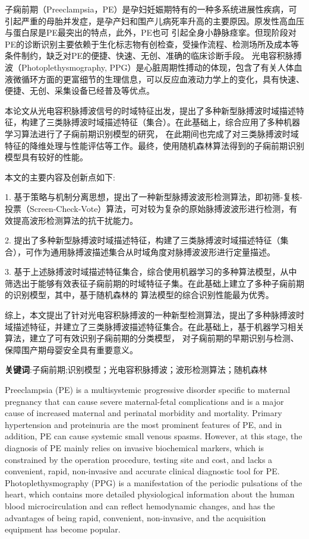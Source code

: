 \cleardoublepage
{}
子痫前期（Preeclampsia，PE）是孕妇妊娠期特有的一种多系统进展性疾病，可引起严重的母胎并发症，是孕产妇和围产儿病死率升高的主要原因。原发性高血压与蛋白尿是PE最突出的特点，此外，PE也可
引起全身小静脉痉挛。但现阶段对PE的诊断识别主要依赖于生化标志物有创检查，受操作流程、检测场所及成本等条件制约，缺乏对PE的便捷、快速、无创、准确的临床诊断手段。
光电容积脉搏波（Photoplethysmography, PPG）是心脏周期性搏动的体现，包含了有关人体血液微循环方面的更富细节的生理信息，可以反应血液动力学上的变化，具有快速、便捷、无创、采集设备已经普及等优点。

本论文从光电容积脉搏波信号的时域特征出发，提出了多种新型脉搏波时域描述特征，构建了三类脉搏波时域描述特征（集合）。在此基础上，综合应用了多种机器学习算法进行了子痫前期识别模型的研究，
在此期间也完成了对三类脉搏波时域特征的降维处理与性能评估等工作。最终，使用随机森林算法得到的子痫前期识别模型具有较好的性能。

本文的主要内容及创新点如下:

1. 基于策略与机制分离思想，提出了一种新型脉搏波波形检测算法，即初筛-复核-投票（Screen-Check-Vote）算法，可对较为复杂的原始脉搏波波形进行检测，有效提高波形检测算法的抗干扰能力。

2. 提出了多种新型脉搏波时域描述特征，构建了三类脉搏波时域描述特征（集合），可作为通用脉搏波描述集合从时域角度对脉搏波波形进行定量描述。

3. 基于上述脉搏波时域描述特征集合，综合使用机器学习的多种算法模型，从中筛选出于能够有效表征子痫前期的时域特征子集。在此基础上建立了多种子痫前期的识别模型，其中，基于随机森林的
算法模型的综合识别性能最为优秀。

综上，本文提出了针对光电容积脉搏波的一种新型检测算法，提出了多种脉搏波时域描述特征，并建立了三类脉搏波描述特征集合。在此基础上，基于机器学习相关算法，建立了可有效识别子痫前期的分类模型，
对子痫前期的早期识别与检测、保障围产期母婴安全具有重要意义。


\textbf{关键词}:子痫前期;识别模型；光电容积脉搏波；波形检测算法；随机森林



\cleardoublepage
{}

Preeclampsia (PE) is a multisystemic progressive disorder specific to maternal pregnancy that can cause severe maternal-fetal complications and is a major cause of increased maternal and perinatal morbidity and mortality. Primary hypertension and proteinuria are the most prominent features of PE, and in addition, PE can
cause systemic small venous spasms. However, at this stage, the diagnosis of PE mainly relies on invasive biochemical markers, which is constrained by the operation procedure, testing site and cost, and lacks a convenient, rapid, non-invasive and accurate clinical diagnostic tool for PE.
Photoplethysmography (PPG) is a manifestation of the periodic pulsations of the heart, which contains more detailed physiological information about the human blood microcirculation and can reflect hemodynamic changes, and has the advantages of being rapid, convenient, non-invasive, and the acquisition equipment has become popular.

